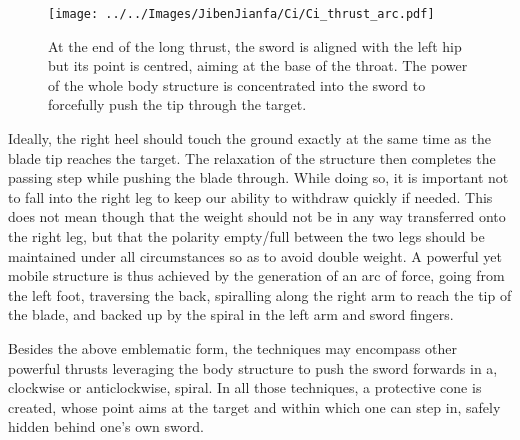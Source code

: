 \begin{figure}[ht]
\centering

	\texttt{[image: ../../Images/JibenJianfa/Ci/Ci\_thrust\_arc.pdf]}
	\caption[Long \Ci{} thrust]{At the end of the long \Ci{} thrust, the sword is aligned with the left hip but its point is centred, aiming at the base of the throat. The power of the whole body structure is concentrated into the sword to forcefully push the tip through the target.}
	\label{fig:ci_thrust}
\end{figure} 

Ideally, the right heel should touch the ground exactly at the same time as the blade tip reaches the target. The relaxation of the structure then completes the passing step while pushing the blade through. While doing so, it is important not to fall into the right leg to keep our ability to withdraw quickly if needed. This does not mean though that the weight should not be in any way transferred onto the right leg, but that the polarity empty/full between the two legs should be maintained under all circumstances so as to avoid double weight. A powerful yet mobile structure is thus achieved by the generation of an arc of force, going from the left foot, traversing the back, spiralling along the right arm to reach the tip of the blade, and backed up by the spiral in the left arm and sword fingers.

Besides the above emblematic form, the \Ci{} techniques may encompass other powerful thrusts leveraging the body structure to push the sword forwards in a, clockwise or anticlockwise, spiral. In all those techniques, a protective cone is created,  whose point aims at the target and within which one can step in, safely hidden behind one's own sword. 

